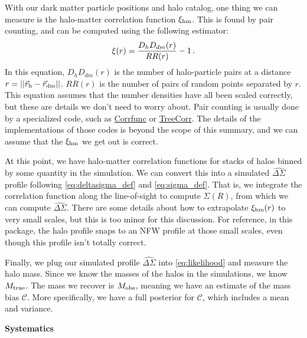\documentclass[12pt]{article}
\newcommand{\ds}{\Delta\Sigma}
\begin{document}
With our dark matter particle positions and halo catalog, one thing we can measure is the halo-matter correlation function $\xi_{\rm hm}$. This is found by pair counting, and can be computed using the following estimator:
%
\begin{equation}
	\label{eq:xihm_estimator}
	\xi_{\rm}(r) = \frac{D_hD_{dm}(r)}{RR(r)} - 1\,.
\end{equation}
%
In this equation, $D_hD_{dm}(r)$ is the number of halo-particle pairs at a distance $r = ||\vec{r}_{\rm h} - \vec{r}_{\rm dm}|| $. $RR(r)$ is the number of pairs of random points separated by $r$. This equation assumes that the number densities have all been scaled correctly, but these are details we don't need to worry about. Pair counting is usually done by a specialized code, such as \href{https://github.com/manodeep/Corrfunc}{Corrfunc} or \href{https://github.com/rmjarvis/TreeCorr}{TreeCorr}. The details of the implementations of those codes is beyond the scope of this summary, and we can assume that the $\xi_{\rm hm}$ we get out is correct.

At this point, we have halo-matter correlation functions for stacks of halos binned by some quantity in the simulation. We can convert this into a simulated $\hat{\Delta\Sigma}$ profile following \autoref{eq:deltasigma_def} and \autoref{eq:sigma_def}. That is, we integrate the correlation function along the line-of-sight to compute $\Sigma(R)$, from which we can compute $\hat{\ds}$. There are some details about how to extrapolate $\xi_{\rm hm}(r)$ to very small scales, but this is too minor for this discussion. For reference, in this package, the halo profile snaps to an NFW profile at those small scales, even though this profile isn't totally correct.

Finally, we plug our simulated profile $\hat{\ds}$ into \autoref{eq:likelihood} and measure the halo mass. Since we know the masses of the halos in the simulations, we know $M_{\rm true}$. The mass we recover is $M_{\rm obs}$, meaning we have an estimate of the mass bias $\mathcal{C}$. More specifically, we have a full posterior for $\mathcal{C}$, which includes a mean and variance.

\vspace{12pt}
\noindent
{\bf Systematics}
\end{document}
